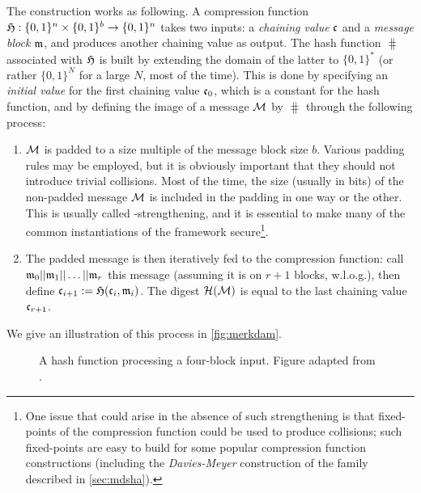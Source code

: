 The construction works as following. A compression function $\operatorname{\mathfrak{H}} : \{0,1\}^n \times \{0,1\}^b \rightarrow \{0,1\}^n$
takes two inputs: a \emph{chaining value} $\mathfrak{c}$ and a \emph{message block} $\mathfrak{m}$, and produces another chaining value as output.
The hash function $\hash$ associated with $\operatorname{\mathfrak{H}}$ is built by extending the domain of the latter to $\{0,1\}^*$ (or rather $\{0,1\}^N$ for a large $N$, most of the time).
This is done by specifying an \emph{initial value} \iv for the first chaining value $\mathfrak{c}_0$, which is a constant for the hash function, and by defining the image
of a message $\mathcal{M}$ by $\hash$ through the following process:
\begin{enumerate}
\item $\mathcal{M}$ is padded to a size multiple of the message block size $b$. Various padding rules may be employed, but it is obviously important that they should not
introduce trivial collisions. Most of the time, the size (usually in bits) of the non-padded message $\mathcal{M}$ is included in the padding in one way or the other.
This is usually called \merkdam-strengthening, and it is essential to make many of the common instantiations of the framework secure\footnote{One issue that
could arise in the absence of such strengthening is that fixed-points of the compression function could be used to produce collisions; such fixed-points
are easy to build for some popular compression function constructions (including the \emph{Davies-Meyer} construction
of the \mdsha family described in \autoref{sec:mdsha}).}.
\item The padded message is then iteratively fed to the compression function: call $\messblock_0||\messblock_1||\linebreak\ldots||\messblock_r$ this message (assuming
it is on $r+1$ blocks, w.l.o.g.), then define $\mathfrak{c}_{i+1} := \operatorname{\mathfrak{H}}(\mathfrak{c}_i, \mathfrak{m}_i)$. The digest $\operatorname{\mathcal{H}}(\mathcal{M})$ is equal to the last
chaining value $\mathfrak{c}_{r+1}$.
\end{enumerate}
We give an illustration of this process in \autoref{fig:merkdam}.

\begin{figure}[!htb]
\begin{center}

\caption{A \merkdam hash function processing a four-block input. Figure adapted from \cite{TiKZ:Cryptographers}.\label{fig:merkdam}}
\end{center}
\end{figure} 

